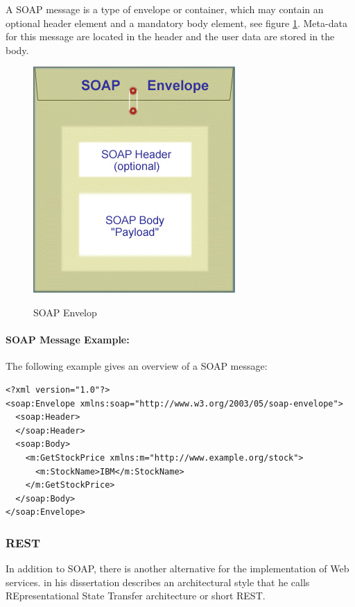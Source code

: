 A SOAP message is a type of envelope or container, which may contain an optional header element and a mandatory body element, see figure \ref{fig:soap_env}. Meta-data for this message are located in the header and the user data are stored in the body.

\begin{figure}[htb]
  \centering
  \includegraphics[scale=0.5]{soap_envelope.jpg}\\
  \caption{SOAP Envelop}
  \label{fig:soap_env}
\end{figure}

\paragraph{SOAP Message Example:}

The following example gives an overview of a SOAP message:

\lstset{language=XML}
\begin{lstlisting}
<?xml version="1.0"?>
<soap:Envelope xmlns:soap="http://www.w3.org/2003/05/soap-envelope">
  <soap:Header>
  </soap:Header>
  <soap:Body>
    <m:GetStockPrice xmlns:m="http://www.example.org/stock">
      <m:StockName>IBM</m:StockName>
    </m:GetStockPrice>
  </soap:Body>
</soap:Envelope>
\end{lstlisting}

\subsubsection{REST\label{sec:back_tech_ws_rest}}
In addition to SOAP, there is another alternative for the implementation of Web services. \citeauthor{Fielding2000} in his dissertation describes an architectural style that he calls REpresentational State Transfer architecture or short REST.

